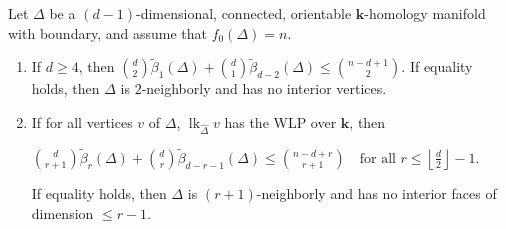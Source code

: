\documentclass[ALCO,ThmDefs,Unicode,epreuves]{cedram}
\DeclareMathOperator\lk{lk}
\newcommand{\complet}[1]{\hat{#1}}
\newcommand{\field}{\mathbf{k}}
\newcommand{\halffloor}{\left\lfloor \frac{d}{2}\right\rfloor}
\begin{document}
\begin{theorem} \label{thm:Kuhnel-indiv}
Let $\Delta$ be a $(d-1)$-dimensional, connected, orientable $\field$-homology manifold with boundary, and assume that $f_0(\Delta)=n$.
\begin{enumerate}
\item\label{theo6.1_1} If $d\geq 4$, then $\binom{d}{2}\tilde{\beta}_1(\Delta)+\binom{d}{1}\tilde{\beta}_{d-2}(\Delta)\leq \binom{n-d+1}{2}$. If equality holds, then $\Delta$ is $2$-neighborly and has no interior vertices.
\item\label{theo6.1_2} If for all vertices $v$ of $\Delta$, $\lk_{\complet{\Delta}}v$ has the WLP over $\field$, then 
\begin{center}
\vspace*{\abovedisplayskip}
$\displaystyle 
\binom{d}{r+1}\tilde{\beta}_r(\Delta)+\binom{d}{r}\tilde{\beta}_{d-r-1}(\Delta)\leq \binom{n-d+r}{r+1} \quad \mbox{for all } r\leq\halffloor-1.$
\vspace*{\belowdisplayskip}
\end{center}
If equality holds, then $\Delta$ is $(r+1)$-neighborly and has no interior faces of dimension $\leq r-1$.
\end{enumerate}
\end{theorem}
\end{document}
